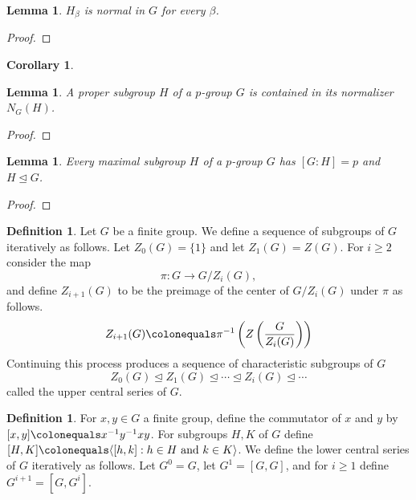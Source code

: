 \documentclass{dcthesis}
\newcommand{\defi}[1]{\textsf{#1}}
\newtheorem{lemma}[prop]{Lemma}
\newtheorem{corr}[prop]{Corollary}
\theoremstyle{definition}
\newtheorem{definition}[prop]{Definition}
\theoremstyle{remark}
\numberwithin{equation}{section}
\numberwithin{figure}{section}
\begin{document}
{{\begin{lemma}
      $H_\beta$ is normal in $G$ for every $\beta$.
    \end{lemma}
    \begin{proof}
    \end{proof}
    \begin{corr}
      \label{cor:normalsubgroupsofallorders}
    \end{corr}
    \begin{lemma}
      \label{lem:propersubgroupcontainedinnormalizer}
      A proper subgroup $H$ of a $p$-group $G$
      is contained in its normalizer $N_G(H)$.
    \end{lemma}
    \begin{proof}
    \end{proof}
    \begin{lemma}
      \label{lem:maximalsubgroup}
      Every maximal subgroup $H$ of a $p$-group $G$
      has $[G:H]=p$ and $H\trianglelefteq G$.
    \end{lemma}
    \begin{proof}
    \end{proof}
    \begin{definition}
      \label{def:uppercentralseries}
      Let $G$ be a finite group.
      We define a sequence of subgroups of $G$ iteratively as follows.
      Let $Z_0(G) = \{1\}$
      and let $Z_1(G) = Z(G)$.
      For $i\geq 2$ consider
      the map
      \[
        \pi\colon G\to G/Z_i(G),
      \]
      and define $Z_{i+1}(G)$ to be the preimage of the center of $G/Z_i(G)$ under $\pi$
      as follows.
      \[
        Z_{i+1}(G)\colonequals\pi^{-1}
        \left(Z\left(\frac{G}{Z_i(G)}\right)\right)
      \]
      Continuing this process produces a sequence of
      characteristic subgroups of $G$
      \[
        Z_0(G)\trianglelefteq Z_1(G)\trianglelefteq\cdots\trianglelefteq Z_{i}(G)\trianglelefteq\cdots
      \]
      called the \defi{upper central series} of $G$.
    \end{definition}
    \begin{definition}
      \label{def:lowercentralseries}
      For $x,y\in G$ a finite group,
      define the \defi{commutator of $x$ and $y$}
      by
      $[x,y]\colonequals x^{-1}y^{-1}xy$.
      For subgroups $H,K$ of $G$ define
      $[H,K]\colonequals\langle[h,k]:h\in H\text{ and }k\in K\rangle$.
      We define the \defi{lower central series} of $G$ iteratively as follows.
      Let $G^0=G$,
      let $G^1 = [G,G]$,
      and for $i\geq 1$ define
      $G^{i+1}=[G,G^i]$.
    \end{definition}
}}
\end{document}
